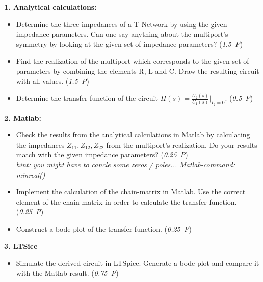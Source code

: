 \documentclass[a4paper]{article}
\begin{document}
\textbf{1. Analytical calculations:}

\begin{itemize}
	\item Determine the three impedances of a T-Network by using the given impedance parameters. Can one say anything about the multiport's symmetry by looking at the given set of impedance parameters? (\textit{1.5~P})
	\item Find the realization of the multiport which corresponds to the given set of parameters by combining the elements R, L and C. Draw the resulting circuit with all values. (\textit{1.5~P})
	\item Determine the transfer function of the circuit $H(s) = \frac{U_2(s)}{U_1(s)}\Big|_{I_2 = 0}$. (\textit{0.5~P})
\end{itemize}

\textbf{2. Matlab:}

\begin{itemize}
	\item Check the results from the analytical calculations in Matlab by calculating the impedances $Z_{11},Z_{12},Z_{22}$ from the multiport's realization. Do your results match with the given impedance parameters? (\textit{0.25~P}) \\
	\textit{hint: you might have to cancle some zeros / poles... Matlab-command: minreal()}
	\item Implement the calculation of the chain-matrix in Matlab. Use the correct element of the chain-matrix in order to calculate the transfer function. (\textit{0.25~P})
	\item Construct a bode-plot of the transfer function. (\textit{0.25~P})

\end{itemize}

\textbf{3. LTSice}

\begin{itemize}
	\item Simulate the derived circuit in LTSpice. Generate a bode-plot and compare it with the Matlab-result. (\textit{0.75~P})
\end{itemize}
\end{document}
